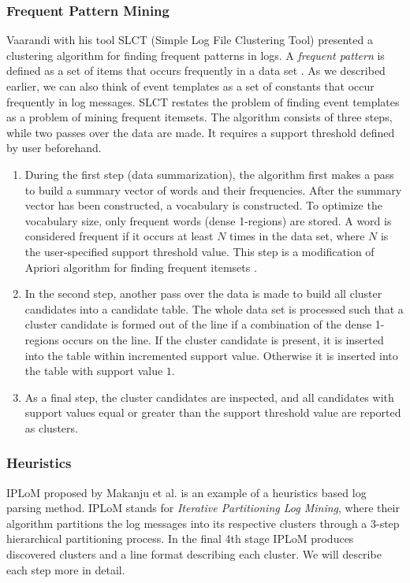     \subsubsection*{Frequent Pattern Mining} 
    Vaarandi with his tool SLCT (Simple Log File Clustering Tool) \cite{vaarandi2003} presented a clustering algorithm for finding frequent patterns in logs. A \textit{frequent pattern} is defined as a set of items that occurs frequently in a data set \cite{zhlhxzl2018}. As we described earlier, we can also think of event templates as a set of constants that occur frequently in log messages. SLCT restates the problem of finding event templates as a problem of mining frequent itemsets. The algorithm consists of three steps, while two passes over the data are made. It requires a support threshold defined by user beforehand.
   
    \begin{enumerate}
       \item During the first step (data summarization), the algorithm first makes a pass to build a summary vector of words and their frequencies. After the summary vector has been constructed, a vocabulary is constructed. To optimize the vocabulary size, only frequent words (dense 1-regions) are stored. A word is considered frequent if it occurs at least $N$ times in the data set, where $N$ is the user-specified support threshold value. This step is a modification of Apriori algorithm for finding frequent itemsets \cite{Agrawal94fastalgorithms}. 
       
       \item In the second step, another pass over the data is made to build all cluster candidates into a candidate table. The whole data set is processed such that a cluster candidate is formed out of the line if a combination of the dense 1-regions occurs on the line. If the cluster candidate is present, it is inserted into the table within incremented support value. Otherwise it is inserted into the table with support value $1$.  
       
       \item As a final step, the cluster candidates are inspected, and all candidates with support values equal or greater than the support threshold value are reported as clusters. 
   \end{enumerate}
   
    
    \subsubsection*{Heuristics}
    IPLoM proposed by Makanju et al. \cite{Makanju2009ALA} is an example of a heuristics based log parsing method. IPLoM stands for \textit{Iterative Partitioning Log Mining}, where their algorithm partitions the log messages into its respective clusters through a 3-step hierarchical partitioning process. In the final 4th stage IPLoM produces discovered clusters and a line format describing each cluster. We will describe each step more in detail.\\
    
